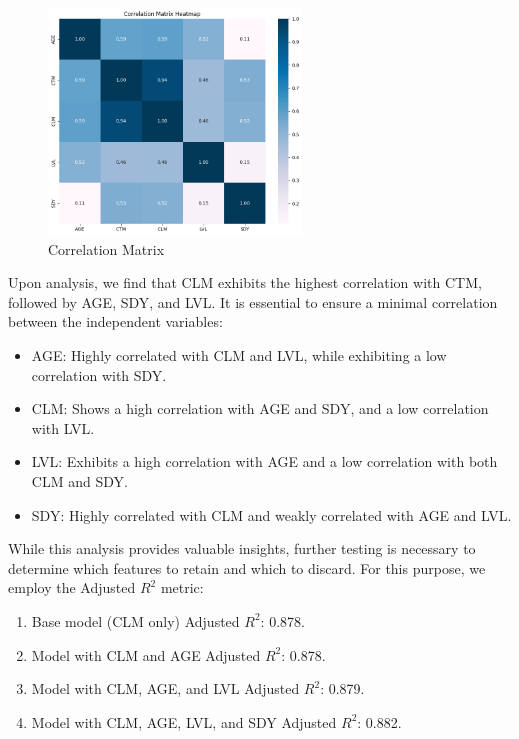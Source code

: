 \documentclass{article}
\begin{document}
\begin{figure}[H]
\centering
\includegraphics[width=0.6\textwidth]{Correlation.png}
\caption{Correlation Matrix}
\label{CM}
\end{figure}


\noindent Upon analysis, we find that CLM exhibits the highest correlation with CTM, followed by AGE, SDY, and LVL. It is essential to ensure a minimal correlation between the independent variables:
\begin{multicols}{2} %
\begin{itemize}
  \item AGE: Highly correlated with CLM and LVL, while exhibiting a low correlation with SDY.
  \item CLM: Shows a high correlation with AGE and SDY, and a low correlation with LVL.
  \item LVL: Exhibits a high correlation with AGE and a low correlation with both CLM and SDY.
  \item SDY: Highly correlated with CLM and weakly correlated with AGE and LVL.
\end{itemize}
\end{multicols}

\noindent While this analysis provides valuable insights, further testing is necessary to determine which features to retain and which to discard. For this purpose, we employ the Adjusted \(R^2\) metric:

\begin{enumerate}
  \item Base model (CLM only) Adjusted \(R^2\): 0.878.
  \item Model with CLM and AGE Adjusted \(R^2\): 0.878.
  \item Model with CLM, AGE, and LVL Adjusted \(R^2\): 0.879.
  \item Model with CLM, AGE, LVL, and SDY Adjusted \(R^2\): 0.882.
\end{enumerate}  
\end{document}
